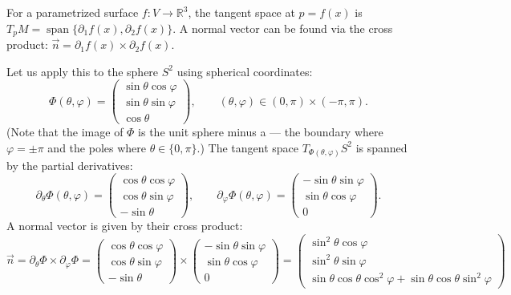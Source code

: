 \begin{example}
\label{ex:tangent_normal_parametrized_sphere}
For a parametrized surface $f : V \to \mathbb{R}^3$, the tangent space at $p = f(x)$ is $T_pM = \operatorname{span}\{\partial_1 f(x), \partial_2 f(x)\}$. A normal vector can be found via the cross product: $\vec{n} = \partial_1 f(x) \times \partial_2 f(x)$.

Let us apply this to the sphere $S^2$ using spherical coordinates:
\[\Phi(\theta,\varphi) = \begin{pmatrix} \sin\theta\cos\varphi \\ \sin\theta\sin\varphi \\ \cos\theta \end{pmatrix}, \qquad (\theta,\varphi) \in (0,\pi) \times (-\pi,\pi).\]
(Note that the image of $\Phi$ is the unit sphere minus a  --- the boundary where $\varphi = \pm\pi$ and the poles where $\theta \in \{0,\pi\}$.)
The tangent space $T_{\Phi(\theta,\varphi)} S^2$ is spanned by the partial derivatives:
\[
\partial_\theta \Phi(\theta,\varphi) = \begin{pmatrix} \cos\theta\cos\varphi \\ \cos\theta\sin\varphi \\ -\sin\theta \end{pmatrix}, \qquad
\partial_\varphi \Phi(\theta,\varphi) = \begin{pmatrix} -\sin\theta\sin\varphi \\ \sin\theta\cos\varphi \\ 0 \end{pmatrix}.
\]
A normal vector is given by their cross product:
\[
\vec{n} = \partial_\theta \Phi \times \partial_\varphi \Phi
= \begin{pmatrix} \cos\theta\cos\varphi \\ \cos\theta\sin\varphi \\ -\sin\theta \end{pmatrix} \times \begin{pmatrix} -\sin\theta\sin\varphi \\ \sin\theta\cos\varphi \\ 0 \end{pmatrix}
= \begin{pmatrix} \sin^2\theta\cos\varphi \\ \sin^2\theta\sin\varphi \\ \sin\theta\cos\theta\cos^2\varphi + \sin\theta\cos\theta\sin^2\varphi \end{pmatrix}
\]
\end{example}
